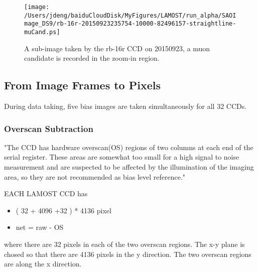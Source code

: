 \documentclass[12pt,twoside,letterpaper]{article}
\begin{document}
   \begin{figure}[!htbp]
   \begin{center}
       \texttt{[image: /Users/jdeng/baiduCloudDisk/MyFigures/LAMOST/run\_alpha/SAOImage\_DS9/rb-16r-20150923235754-10000-82496157-straightline-muCand.ps]}
       \caption{A sub-image taken by the rb-16r CCD on 20150923, a
   muon candidate is recorded in the zoom-in region.}
       \label{Fig:ImageDS9_rb_16r_muon}
   \end{center}    
   \end{figure}


\subsection{From Image Frames to Pixels} 



During data taking, five bias images are taken simultaneously for all
32 CCDs. 

\subsubsection{Overscan Subtraction} 
"The CCD has hardware overscan(OS) regions of two columns at each end of
the serial register. These areas are somewhat too small for a high
signal to noise measurement and are suspected to be affected by the
illumination of the imaging area, so they are not recommended as bias
level reference." 

EACH LAMOST CCD has
       \begin{itemize}
           \item ( 32 + 4096  +32 ) * 4136 pixel 
	   \item net = raw - OS
       \end{itemize}
where there are 32 pixels in each of the two overscan regions. The x-y
plane is chosed so that there are 4136 pixels in the y direction. The
two overscan regions are along the x direction. 
\end{document}
